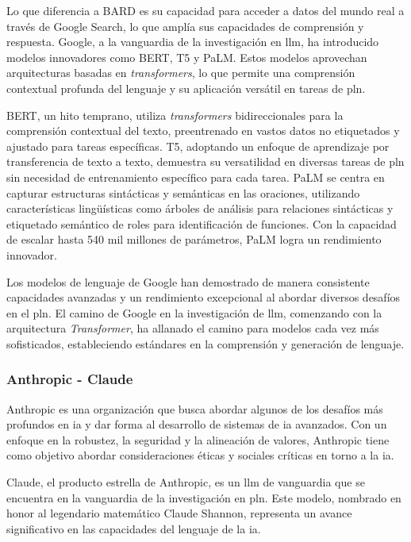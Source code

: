 Lo que diferencia a BARD es su capacidad para acceder a datos del mundo real a través de Google Search, lo que amplía sus capacidades de comprensión y respuesta. Google, a la vanguardia de la investigación en \acrshort{llm}, ha introducido modelos innovadores como BERT, T5 y PaLM. Estos modelos aprovechan arquitecturas basadas en \textit{transformers}, lo que permite una comprensión contextual profunda del lenguaje y su aplicación versátil en tareas de \acrlong{pln}.

BERT, un hito temprano, utiliza \textit{transformers} bidireccionales para la comprensión contextual del texto, preentrenado en vastos datos no etiquetados y ajustado para tareas específicas. T5, adoptando un enfoque de aprendizaje por transferencia de texto a texto, demuestra su versatilidad en diversas tareas de \acrlong{pln} sin necesidad de entrenamiento específico para cada tarea. PaLM se centra en capturar estructuras sintácticas y semánticas en las oraciones, utilizando características lingüísticas como árboles de análisis para relaciones sintácticas y etiquetado semántico de roles para identificación de funciones. Con la capacidad de escalar hasta 540 mil millones de parámetros, PaLM logra un rendimiento innovador.

Los modelos de lenguaje de Google han demostrado de manera consistente capacidades avanzadas y un rendimiento excepcional al abordar diversos desafíos en el \acrshort{pln}. El camino de Google en la investigación de \acrshort{llm}, comenzando con la arquitectura \textit{Transformer}, ha allanado el camino para modelos cada vez más sofisticados, estableciendo estándares en la comprensión y generación de lenguaje.

\subsubsection{Anthropic - Claude}

Anthropic es una organización que busca abordar algunos de los desafíos más profundos en \acrlong{ia} y dar forma al desarrollo de sistemas de \acrshort{ia} avanzados. Con un enfoque en la robustez, la seguridad y la alineación de valores, Anthropic tiene como objetivo abordar consideraciones éticas y sociales críticas en torno a la \acrshort{ia}.

Claude, el producto estrella de Anthropic, es un \acrlong{llm} de vanguardia que se encuentra en la vanguardia de la investigación en \acrlong{pln}. Este modelo, nombrado en honor al legendario matemático Claude Shannon, representa un avance significativo en las capacidades del lenguaje de la \acrshort{ia}. 

